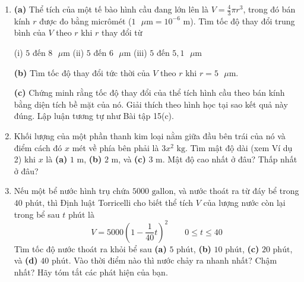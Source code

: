 \begin{minipage}[t]{0.48\textwidth}
\begin{enumerate}[label=\textbf{\arabic*.}, leftmargin=1.8em, itemsep=7pt, parsep=0pt, topsep=0pt, start=14]
\item \textbf{(a)} Thể tích của một tế bào hình cầu đang lớn lên là $V = \frac{4}{3}\pi r^3$, trong đó bán kính $r$ được đo bằng micrômét ($1\text{ }\mu\text{m} = 10^{-6}\text{ m}$). Tìm tốc độ thay đổi trung bình của $V$ theo $r$ khi $r$ thay đổi từ
\par\vspace{2pt}
\hspace*{0.5em}(i) $5$ đến $8\text{ }\mu\text{m}$ \qquad (ii) $5$ đến $6\text{ }\mu\text{m}$ \qquad (iii) $5$ đến $5{,}1\text{ }\mu\text{m}$
\par\vspace{3pt}
\textbf{(b)} Tìm tốc độ thay đổi tức thời của $V$ theo $r$ khi $r = 5\text{ }\mu\text{m}$.
\par\vspace{3pt}
\textbf{(c)} Chứng minh rằng tốc độ thay đổi của thể tích hình cầu theo bán kính bằng diện tích bề mặt của nó. Giải thích theo hình học tại sao kết quả này đúng. Lập luận tương tự như Bài tập 15(c).

\item Khối lượng của một phần thanh kim loại nằm giữa đầu bên trái của nó và điểm cách đó $x$ mét về phía bên phải là $3x^2\text{ kg}$. Tìm mật độ dài (xem Ví dụ 2) khi $x$ là \textbf{(a)} $1\text{ m}$, \textbf{(b)} $2\text{ m}$, và \textbf{(c)} $3\text{ m}$. Mật độ cao nhất ở đâu? Thấp nhất ở đâu?

\item Nếu một bể nước hình trụ chứa $5000\text{ gallon}$, và nước thoát ra từ đáy bể trong $40\text{ phút}$, thì Định luật Torricelli cho biết thể tích $V$ của lượng nước còn lại trong bể sau $t$ phút là
\[
V = 5000\left(1 - \frac{1}{40}t\right)^2 \qquad 0 \leqslant t \leqslant 40
\]
Tìm tốc độ nước thoát ra khỏi bể sau \textbf{(a)} $5\text{ phút}$, \textbf{(b)} $10\text{ phút}$, \textbf{(c)} $20\text{ phút}$, và \textbf{(d)} $40\text{ phút}$. Vào thời điểm nào thì nước chảy ra nhanh nhất? Chậm nhất? Hãy tóm tắt các phát hiện của bạn.

\end{enumerate}
\end{minipage}\hfill
